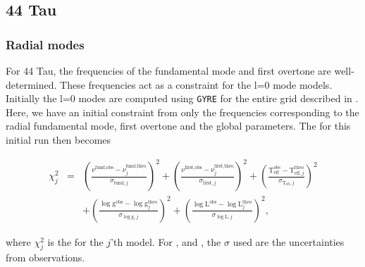 
\subsection{44 Tau}
\label{sec:chi44}

\subsubsection{Radial modes}

For 44 Tau, the frequencies of the fundamental mode and first overtone are well-determined. These frequencies act as a constraint for the l=0 mode models. Initially the l=0 modes are computed using \texttt{GYRE} for the entire grid described in . Here, we have an initial constraint from only the frequencies corresponding to the radial fundamental mode, first overtone and the global parameters. The \chis for this initial run then becomes

\begin{align}
\chi^2_j & = & \left(\frac{\nu^{\text{fund,obs}}-\nu_j^{\text{fund,theo}}}{\sigma_{\text{fund},j}}\right)^2 
 + \left(\frac{\nu^{\text{first,obs}}-\nu_j^{\text{first,theo}}}{\sigma_{\text{first},j}}\right)^2 
 +
\left(\frac{\text{T}_\text{eff}^{obs}-\text{T}_{\text{eff},j}^{\text{theo}}}{\sigma_{\text{T}_\text{eff},j}}\right)^2 \nonumber \\
& & +
\left(\frac{\log \text{g}^\text{obs}-\log \text{g}^\text{theo}_j}{\sigma_{\log \text{g},j}}\right)^2 
 + \left(\frac{\log \text{L}^{\text{obs}}-\log \text{L}^\text{theo}_j}{\sigma_{\log \text{L},j}}\right)^2, 
 \label{eq:chis}
\end{align}

\noindent where $\chi^2_j$ is the \chis for the $j$'th model. For \teff, \logg and \lum, the $\sigma$ used are the uncertainties from observations. %

